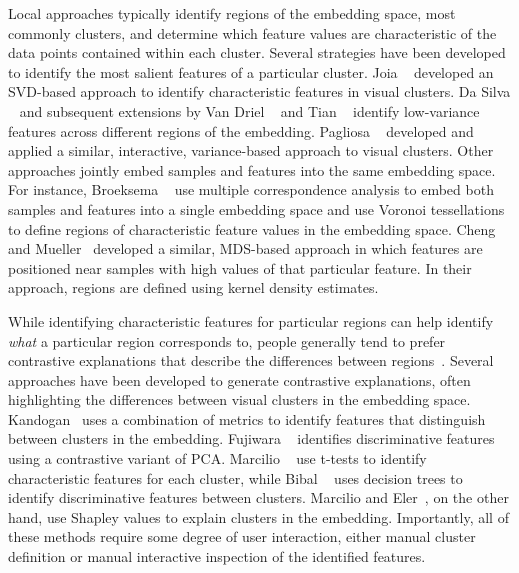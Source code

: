 \documentclass[lettersize,journal]{IEEEtran}
\begin{document}
Local approaches typically identify regions of the embedding space, most commonly clusters, and determine which feature values are characteristic of the data points contained within each cluster.
Several strategies have been developed to identify the most salient features of a particular cluster.
Joia \etal~\cite{Joia2015} developed an SVD-based approach to identify characteristic features in visual clusters.
Da Silva \etal~\cite{DaSilva2015} and subsequent extensions by Van Driel \etal~\cite{VanDriel2020} and Tian \etal~\cite{Tian2021} identify low-variance features across different regions of the embedding.
Pagliosa \etal~\cite{Pagliosa2016} developed and applied a similar, interactive, variance-based approach to visual clusters.
Other approaches jointly embed samples and features into the same embedding space.
For instance, Broeksema \etal~\cite{Broeksema2013} use multiple correspondence analysis to embed both samples and features into a single embedding space and use Voronoi tessellations to define regions of characteristic feature values in the embedding space.
Cheng and Mueller~\cite{ChengMueller2016} developed a similar, MDS-based approach in which features are positioned near samples with high values of that particular feature. In their approach, regions are defined using kernel density estimates.

While identifying characteristic features for particular regions can help identify \textit{what} a particular region corresponds to, people generally tend to prefer contrastive explanations that describe the differences between regions~\cite{Miller2019}.
Several approaches have been developed to generate contrastive explanations, often highlighting the differences between visual clusters in the embedding space.
Kandogan~\cite{Kandogan2012} uses a combination of metrics to identify features that distinguish between clusters in the embedding.
Fujiwara \etal~\cite{Fujiwara2020} identifies discriminative features using a contrastive variant of PCA.
Marcilio \etal~\cite{Marcilio2021} use t-tests to identify characteristic features for each cluster, while Bibal \etal~\cite{Bibal2021} uses decision trees to identify discriminative features between clusters.
Marcilio and Eler~\cite{MarcilioEler2021}, on the other hand, use Shapley values to explain clusters in the embedding.
Importantly, all of these methods require some degree of user interaction, either manual cluster definition or manual interactive inspection of the identified features.
\end{document}
